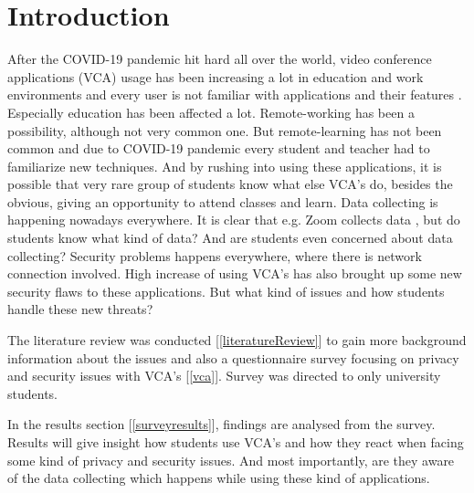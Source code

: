 \documentclass[utf8,english]{gradu3}
\begin{document}
\mainmatter


\sloppypar 



\chapter{Introduction}
\label{introduction}
After the COVID-19 pandemic hit hard all over the world, video conference applications (VCA) usage has been increasing a lot in education and work environments and every user is not familiar with applications and their features \parencite{zsolt2020}. Especially education has been affected a lot. Remote-working has been a possibility, although not very common one. But remote-learning has not been common and due to COVID-19 pandemic every student and teacher had to familiarize new techniques. And by rushing into using these applications, it is possible that very rare group of students know what else VCA's do, besides the obvious, giving an opportunity to attend classes and learn. Data collecting is happening nowadays everywhere. It is clear that e.g. Zoom collects data \parencite{zoomData}, but do students know what kind of data? And are students even concerned about data collecting?
Security problems happens everywhere, where there is network connection involved. High increase of using VCA's has also brought up some new security flaws to these applications. But what kind of issues and how students handle these new threats?
%

The literature review was conducted [\ref{literatureReview}] to gain more background information about the issues and also a questionnaire survey focusing on privacy and security issues with VCA's [\ref{vca}]. Survey was directed to only university students.
%

%
In the results section [\ref{surveyresults}], findings are analysed from the survey. Results will give insight how students use VCA's and how they react when facing some kind of privacy and security issues. And most importantly, are they aware of the data collecting which happens while using these kind of applications.
\end{document}
